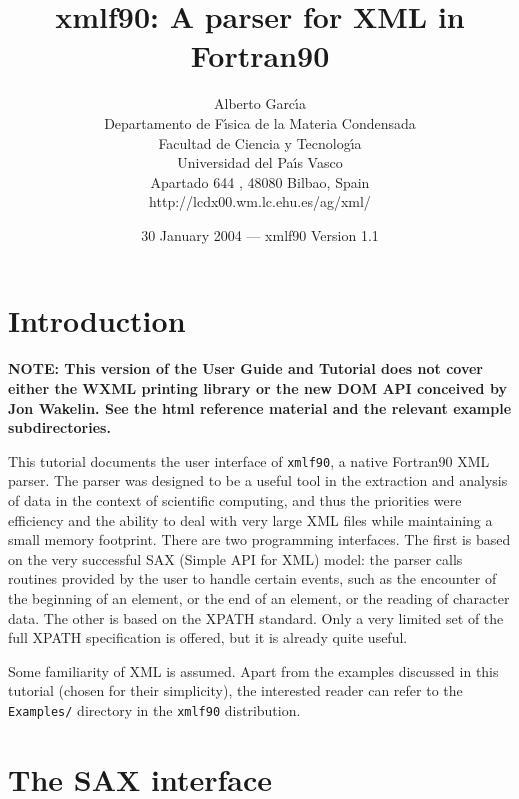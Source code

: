 \documentclass[11pt]{article}
\begin{document}
\title{xmlf90: A parser for XML in Fortran90}
\author{Alberto Garc\'{\i}a \\
           Departamento de F\'{\i}sica de la Materia Condensada \\
           Facultad de Ciencia y Tecnolog\'{\i}a \\
           Universidad del Pa\'{\i}s Vasco\\
           Apartado 644 , 48080 Bilbao, Spain\\
           http://lcdx00.wm.lc.ehu.es/ag/xml/}
\date{30 January 2004 --- xmlf90 Version 1.1}

\maketitle\section{Introduction}

{\bf NOTE: This version of the User Guide and Tutorial does not
cover either the WXML printing library or the new DOM API 
conceived by Jon Wakelin. See the html reference material and the
relevant example subdirectories.}
\bigskip

This tutorial documents the user interface of \texttt{xmlf90}, a
native Fortran90 XML parser. The parser was designed to be a useful
tool in the extraction and analysis of data in the context of
scientific computing, and thus the priorities were efficiency and the
ability to deal with very large XML files while maintaining a small
memory footprint. There are two programming interfaces. The first is
based on the very successful SAX (Simple API for XML) model: the
parser calls routines provided by the user to handle certain events,
such as the encounter of the beginning of an element, or the end of an
element, or the reading of character data.  The other is based on the
XPATH standard. Only a very limited set of the full XPATH
specification is offered, but it is already quite useful.

Some familiarity of XML is assumed. Apart from the examples discussed
in this tutorial (chosen for their simplicity), the interested reader
can refer to the \texttt{Examples/} directory in the \texttt{xmlf90}
distribution.



\section{The SAX interface}
\end{document}
